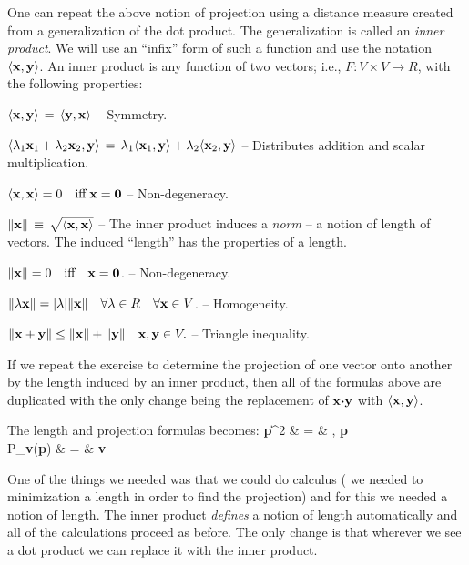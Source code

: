\documentclass[12pt]{article}
\begin{document}
One can repeat the above notion of projection using a distance measure created from a generalization of the dot product.
The generalization is called an {\em inner product}. We will use an ``infix'' form of such a function and use the notation
$\langle{\bf x}, {\bf y}\rangle$. An inner product is any function of two vectors; i.e., $F: V \times V \rightarrow R$,  with the following properties:
\bi
  \item{ $ \langle {\bf x}, {\bf y}\rangle \, = \, \langle{\bf y}, {\bf x}\rangle$ -- Symmetry.}
  \item{ $ \langle \lambda_1 {\bf x}_1 + \lambda_2 {\bf x}_2, {\bf y}\rangle \, = \, 
      \lambda_1 \langle{\bf x}_1, {\bf y}\rangle + \lambda_2 \langle{\bf x}_2, {\bf y}\rangle $ -- Distributes addition and scalar multiplication.}
  \item{ $ \langle {\bf x}, {\bf x}\rangle = 0 \quad \text{iff} \; {\bf x} = {\bf 0} $ -- Non-degeneracy.}
  \item{ $\|{\bf x}\| \, \equiv \, \sqrt{\langle{\bf x}, {\bf x}\rangle}$ -- 
      The inner product induces a {\em norm} -- a notion of length of vectors.}
\ei
    The induced ``length'' has the properties of a length.
\bi
  \item{$\|{\bf x}\| = 0 \quad \text{iff} \quad {\bf x} = {\bf 0}$. -- Non-degeneracy.}
  \item{$ \|\lambda {\bf x}\| = |\lambda| \|{\bf x}\|\quad \forall \lambda \in R \quad \forall {\bf x} \in V$. -- Homogeneity.}
  \item{$\|{\bf x} + {\bf y} \| \le \|{\bf x}\| + \|{\bf y}\| \quad {\bf x}, {\bf y} \in V.$ -- Triangle inequality.}
\ei

If we repeat the exercise to determine the projection of one vector onto 
another by the length induced by an inner product, then all of the 
formulas above are duplicated with the only change being the replacement 
of ${\bf x} {\boldsymbol \cdot} {\bf y}$ with $\langle{\bf x}, {\bf y}\rangle$.

The length and projection formulas becomes:
\be
  \|{\bf p}\|^2 & = & , {\bf p} \rangle \\
  P_{\bf v}({\bf p}) & = &  {\bf v}
\ee

One of the things we needed was that we could do calculus 
( we needed to minimization a length in order to find the projection)
and for this we needed a notion of length. The inner product {\em defines\/} 
a notion of length automatically and all of the calculations proceed as before.
The only change is that wherever we see a dot product we can replace it with 
the inner product.
\end{document}
